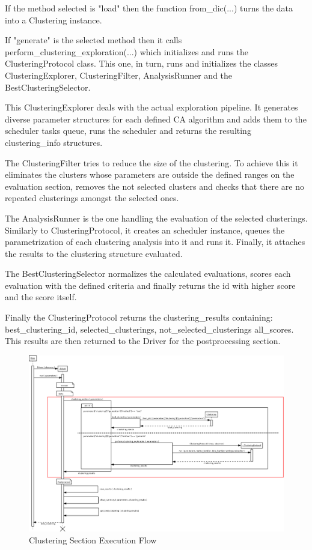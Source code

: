 If the method selected is "load" then the function from\_dic(...) turns the data into a Clustering instance. 

If "generate" is the selected method then it calls perform\_clustering\_exploration(...) which initializes and runs the ClusteringProtocol class. This one, in turn, runs and initializes the classes  ClusteringExplorer, ClusteringFilter, AnalysisRunner and the BestClusteringSelector.

This ClusteringExplorer deals with the actual exploration pipeline. It generates diverse parameter structures for each defined CA algorithm and adds them to the scheduler tasks queue, runs the scheduler and returns the resulting clustering\_info structures. 

The ClusteringFilter tries to reduce the size of the clustering. To achieve this it eliminates the clusters whose parameters are outside the defined ranges on the evaluation section, removes the not selected clusters and checks that there are no repeated clusterings amongst the selected ones.

The AnalysisRunner is the one handling the evaluation of the selected clusterings. Similarly to ClusteringProtocol, it creates an scheduler instance, queues the parametrization of each clustering analysis into it and runs it. Finally, it attaches the results to the clustering structure evaluated.

The BestClusteringSelector normalizes the calculated evaluations, scores each evaluation with the defined criteria and finally returns the id with higher score and the score itself.

Finally the ClusteringProtocol returns the clustering\_results containing:  best\_clustering\_id, selected\_clusterings, not\_selected\_clusterings all\_scores. This results are then returned to the Driver for the postprocessing section.

\begin{landscape}
\begin{figure}
\includegraphics[width=24cm]{img/clustering_sequence_driver.png}
\caption{Clustering Section Execution Flow}
\label{fig:clustering_section}
\end{figure}
\end{landscape}




